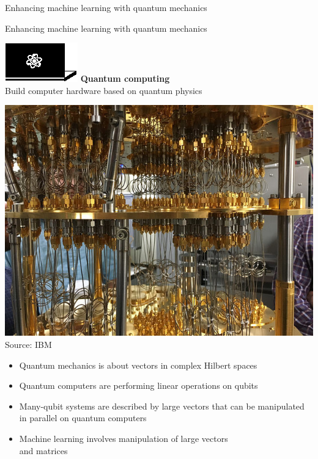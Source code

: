 \documentclass[10pt]{beamer}
\begin{document}
{\begin{frame}[fragile]{Enhancing machine learning with quantum mechanics}
\end{frame}
}

{
\begin{frame}[fragile]{Enhancing machine learning with quantum mechanics}

\begin{minipage}[c]{0.39\textwidth}
\vspace{2.8cm}
\centering
\hspace{-1cm}\includegraphics[scale=2.2]{Vectors/laptop_q.eps}
\flushleft
\textbf{Quantum computing}\\
Build computer hardware based on quantum physics
\end{minipage}%
\hspace{0.1cm}
\begin{minipage}[c]{0.59\textwidth}
\centering
\includegraphics[scale=0.16]{ibm-quantum-computer.jpg}\\
\tiny{Source: IBM}
\vspace{0.1cm}
\flushleft
\normalsize
\begin{itemize}
\item Quantum mechanics is about vectors in complex Hilbert spaces
\item Quantum computers are performing linear operations on qubits
\item Many-qubit systems are described by large vectors that can be manipulated in parallel on quantum computers
\item Machine learning involves manipulation of large vectors\\ and matrices
\end{itemize}
\end{minipage}

\end{frame}
}
\end{document}
